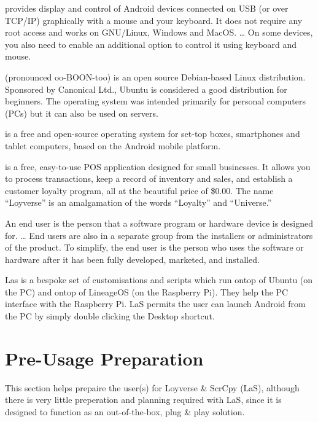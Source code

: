 \documentclass[letterpaper,10pt,openany,oneside,english]{sphinxmanual}
\begin{document}
 provides display and control of Android devices connected on USB (or over TCP/IP) graphically with a mouse and your keyboard. It does not require any root access and works on GNU/Linux, Windows and MacOS. … On some devices, you also need to enable an additional option to control it using keyboard and mouse.

 (pronounced oo-BOON-too) is an open source Debian-based Linux distribution. Sponsored by Canonical Ltd., Ubuntu is considered a good distribution for beginners. The operating system was intended primarily for personal computers (PCs) but it can also be used on servers.

 is a free and open-source operating system for set-top boxes, smartphones and tablet computers, based on the Android mobile platform.

 is a free, easy-to-use POS application designed for small businesses. It allows you to process transactions, keep a record of inventory and sales, and establish a customer loyalty program, all at the beautiful price of \$0.00. The name “Loyverse” is an amalgamation of the words “Loyalty” and “Universe.”

 An end user is the person that a software program or hardware device is designed for. … End users are also in a separate group from the installers or administrators of the product. To simplify, the end user is the person who uses the software or hardware after it has been fully developed, marketed, and installed.

 Las is a bespoke set of customisations and scripts which run ontop of Ubuntu (on the PC) and ontop of LineageOS (on the Raspberry Pi). They help the PC interface with the Raspberry Pi. LaS permits the user can launch Android from the PC by simply double clicking the Desktop shortcut.


\section{Pre-Usage Preparation}
\label{\detokenize{preperation:pre-usage-preparation}}\label{\detokenize{preperation::doc}}
This section helps prepaire the user(s) for Loyverse \& ScrCpy (LaS), although there is very little preperation and planning required with LaS, since it is designed to function as an out-of-the-box, plug \& play solution.
\end{document}
